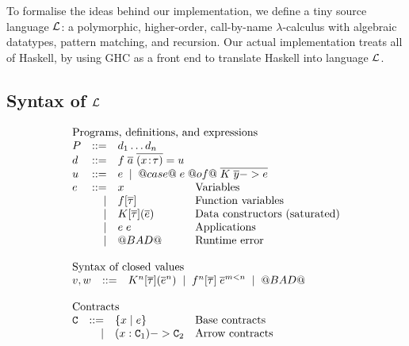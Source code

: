 To formalise the ideas behind our implementation, we define a
tiny source language $\cal L$:
a polymorphic, higher-order, call-by-name $\lambda$-calculus with
algebraic datatypes, pattern matching, and recursion.
Our actual implementation treats all of Haskell, by using GHC as a front
end to translate Haskell into language $\cal L$.

\subsection{Syntax of $\cal L$} \label{s:syntax}

\begin{figure}
\[\begin{array}{l}
\begin{array}{lrll}
\multicolumn{4}{l}{\text{Programs, definitions, and expressions}} \\
P   & ::= & d_1 \ldots d_n \\
d   & ::= & f\; \ol{a} \; \ol{(x\!:\!\tau)} = u \\
u   & ::= & \multicolumn{2}{l}{e \; \mid \; @case@\;e\;@of@\;\ol{K\;\ol{y} -> e}} \\
e  & ::=  & x            & \text{Variables} \\
   & \mid & f[\ol{\tau}] & \text{Function variables} \\
   & \mid & K[\ol{\tau}](\ol{e}) & \text{Data constructors (saturated)} \\
   & \mid & e\;e         & \text{Applications} \\
   & \mid & @BAD@        & \text{Runtime error} \\
\end{array}\\ \\
\begin{array}{lrll}
\multicolumn{3}{l}{\text{Syntax of closed values}} \\
 v,w & ::= & K^\ar[\ol{\tau}](\oln{e}{\ar}) \;\mid\; f^\ar[\ol{\tau}]\;\oln{e}{m < \ar} \;\mid\; @BAD@ \\ \\
\end{array}
\\
\begin{array}{lrll}
\multicolumn{3}{l}{\text{Contracts}} \\
 \Ct & ::=  & \{ x \mid e \}        & \text{Base contracts}  \\
     & \mid &  (x : \Ct_1) -> \Ct_2      & \text{Arrow contracts} \\

\end{array}
\end{array}\]
\end{figure}
